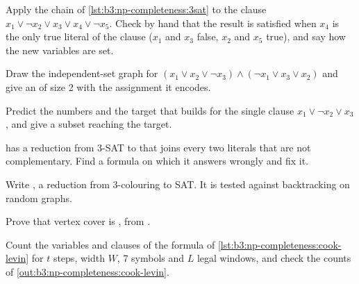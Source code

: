 \begin{exercise}[$\star$]\label{exo:b3:np-completeness:2}
Apply the chain of \cref{lst:b3:np-completeness:3sat} to the clause $x_1 \vee \neg x_2 \vee x_3 \vee x_4 \vee \neg x_5$. Check by hand that the result is satisfied when $x_4$ is the only true literal of the clause ($x_1$ and $x_3$ false, $x_2$ and $x_5$ true), and say how the new variables are set.
\end{exercise}

\begin{exercise}[$\star$]\label{exo:b3:np-completeness:3}
Draw the independent-set graph for $(x_1 \vee x_2 \vee \neg x_3) \wedge (\neg x_1 \vee x_3 \vee x_2)$ and give an  of size 2 with the assignment it encodes.
\end{exercise}

\begin{exercise}[$\star$]\label{exo:b3:np-completeness:4}
Predict the numbers and the target that  builds for the single clause $x_1 \vee \neg x_2 \vee x_3$, and give a subset reaching the target.
\end{exercise}

\begin{exercise}[$\star\star$]\label{exo:b3:np-completeness:5}
 has a reduction from 3-SAT to  that joins every two literals that are not complementary. Find a formula on which it answers wrongly and fix it.
\end{exercise}

\begin{exercise}[$\star\star$]\label{exo:b3:np-completeness:6}
Write , a reduction from 3-colouring to SAT. It is tested against backtracking on random graphs.
\end{exercise}

\begin{exercise}[$\star\star$]\label{exo:b3:np-completeness:7}
Prove that vertex cover is , from .
\end{exercise}

\begin{exercise}[$\star\star$]\label{exo:b3:np-completeness:8}
Count the variables and clauses of the formula of \cref{lst:b3:np-completeness:cook-levin} for $t$ steps, width $W$, 7 symbols and $L$ legal windows, and check the counts of \cref{out:b3:np-completeness:cook-levin}.
\end{exercise}

